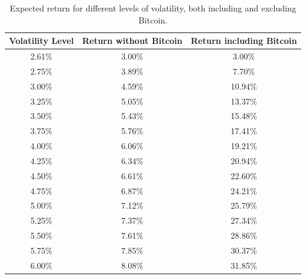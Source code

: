\begin{table}
	\small
	\centering
	\caption[Markowitz efficient frontier on volatility]{Expected return for different levels of volatility, both including and excluding Bitcoin.}
	\label{tab:markowitz_ret_on_vol}
\begin{tabular}{ccc}

Volatility Level & Return without Bitcoin & Return including Bitcoin \\
\midrule
2.61\% & 3.00\% & 3.00\% \\
2.75\% & 3.89\% & 7.70\% \\
3.00\% & 4.59\% & 10.94\% \\
3.25\% & 5.05\% & 13.37\% \\
3.50\% & 5.43\% & 15.48\% \\
3.75\% & 5.76\% & 17.41\% \\
4.00\% & 6.06\% & 19.21\% \\
4.25\% & 6.34\% & 20.94\% \\
4.50\% & 6.61\% & 22.60\% \\
4.75\% & 6.87\% & 24.21\% \\
5.00\% & 7.12\% & 25.79\% \\
5.25\% & 7.37\% & 27.34\% \\
5.50\% & 7.61\% & 28.86\% \\
5.75\% & 7.85\% & 30.37\% \\
6.00\% & 8.08\% & 31.85\% \\
\midrule
\end{tabular}
\end{table}

